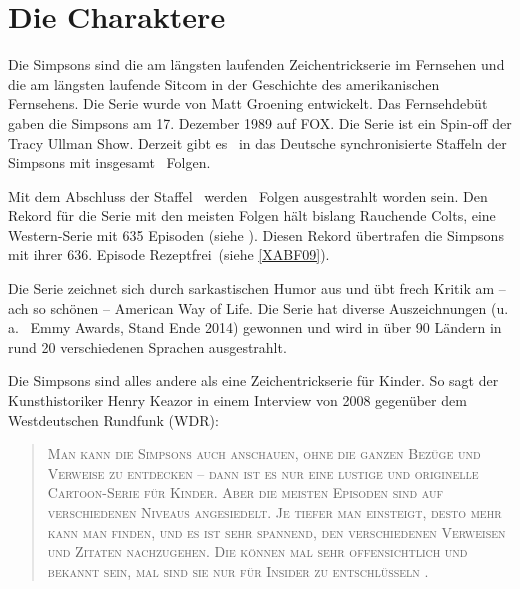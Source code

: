 \chapter{Die Charaktere}\label{Charaktere}

Die Simpsons sind die am längsten laufenden Zeichentrickserie im Fernsehen und die am längsten laufende Sitcom in der Geschichte des amerikanischen Fernsehens. Die Serie wurde von Matt Groening entwickelt. Das Fernsehdebüt gaben die Simpsons am 17. Dezember 1989 auf FOX. Die Serie ist ein Spin-off der \glqq Tracy Ullman Show\grqq . Derzeit gibt es \staffelAnzahl\ in das Deutsche synchronisierte Staffeln der Simpsons mit insgesamt \episodenAnzahl\ Folgen.

Mit dem Abschluss der Staffel \staffelAnzahl\ werden \episodenAnzahl\ Folgen ausgestrahlt worden sein. Den Rekord für die Serie mit den meisten Folgen hält bislang \glqq Rauchende Colts\grqq , eine Western-Serie mit 635 Episoden (siehe \cite{Serienrekord}). Diesen Rekord übertrafen die Simpsons mit ihrer 636. Episode \glqq Rezeptfrei\grqq\ (siehe \ref{XABF09}).

Die Serie zeichnet sich durch sarkastischen Humor aus und übt frech Kritik am -- ach so schönen -- \glqq American Way of Life\grqq . Die Serie hat diverse Auszeichnungen (u.\,a. \emmyAnzahl\ Emmy Awards, Stand Ende 2014) gewonnen und wird in über 90 Ländern in rund 20 verschiedenen Sprachen ausgestrahlt.

Die Simpsons sind alles andere als eine Zeichentrickserie für Kinder. So sagt der Kunsthistoriker Henry Keazor in einem Interview von 2008 gegenüber dem Westdeutschen Rundfunk (WDR):
\begin{quotation}
\scshape
\glqq Man kann die Simpsons auch anschauen, ohne die ganzen Be\-zü\-ge und Verweise zu entdecken -- dann ist es nur eine lustige und originelle Cartoon-Serie für Kinder. Aber die meisten Episoden sind auf verschiedenen Niveaus angesiedelt. Je tiefer man einsteigt, desto mehr kann man finden, und es ist sehr spannend, den verschiedenen Verweisen und Zitaten nachzugehen. Die können mal sehr offensichtlich und bekannt sein, mal sind sie nur für Insider zu entschlüsseln \cite{HenryKeazor}\grqq .
\end{quotation}

